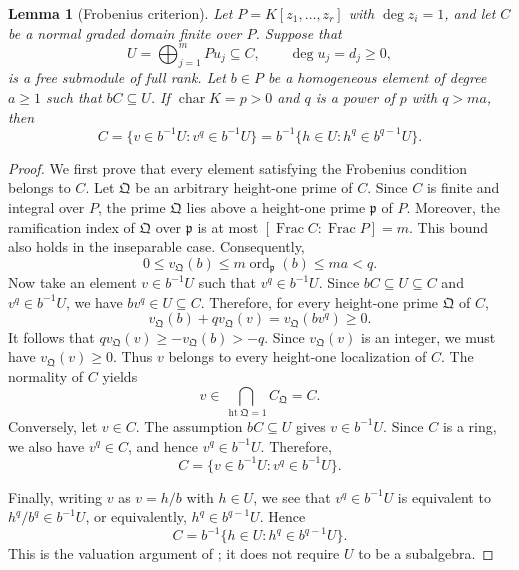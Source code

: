 \documentclass[12pt]{amsart}
\numberwithin{equation}{section}
\newtheorem{lemma}[theorem]{Lemma}
\theoremstyle{definition}
\theoremstyle{remark}
\numberwithin{equation}{section}
\begin{document}
\begin{lemma}[Frobenius criterion]
\label{lem:index-Frobenius}
Let $P=K[z_1,\ldots,z_r]$ with $\deg z_i=1$, and let $C$ be a normal graded domain finite over $P$. Suppose that
\[
U=\bigoplus_{j=1}^mPu_j\subseteq C,\qquad \deg u_j=d_j\ge0,
\]
is a free submodule of full rank. Let $b\in P$ be a homogeneous element of degree $a\ge1$ such that $bC\subseteq U$. If $\operatorname{char}K=p>0$ and $q$ is a power of $p$ with $q>ma$, then
\[
C=\{v\in b^{-1}U:v^q\in b^{-1}U\}=b^{-1}\{h\in U:h^q\in b^{q-1}U\}.
\]
\end{lemma}
\begin{proof}
We first prove that every element satisfying the Frobenius condition belongs to $C$. Let $\mathfrak Q$ be an arbitrary height-one prime of $C$.
Since $C$ is finite and integral over $P$, the prime $\mathfrak Q$ lies above a height-one prime $\mathfrak p$ of $P$.
Moreover, the ramification index of $\mathfrak Q$ over $\mathfrak p$ is at most $[\operatorname{Frac}C:\operatorname{Frac}P]=m$.
This bound also holds in the inseparable case. Consequently,
\[
 0\le v_{\mathfrak Q}(b)
 \le m\operatorname{ord}_{\mathfrak p}(b)
 \le ma<q.
\]
Now take an element $v\in b^{-1}U$ such that $v^q\in b^{-1}U$. Since $bC\subseteq U\subseteq C$ and $v^q\in b^{-1}U$, we have $bv^q\in U\subseteq C$.
Therefore, for every height-one prime $\mathfrak Q$ of $C$,
\[
 v_{\mathfrak Q}(b)+qv_{\mathfrak Q}(v)
 =v_{\mathfrak Q}(bv^q)\ge0.
\]
It follows that $qv_{\mathfrak Q}(v) \ge -v_{\mathfrak Q}(b)>-q$.
Since $v_{\mathfrak Q}(v)$ is an integer, we must have $v_{\mathfrak Q}(v)\ge0$.
Thus $v$ belongs to every height-one localization of $C$. The normality of $C$ yields
\[
 v\in\bigcap_{\operatorname{ht}\mathfrak Q=1}C_{\mathfrak Q} =C.
\]
Conversely, let $v\in C$. The assumption $bC\subseteq U$ gives $v\in b^{-1}U$. Since $C$ is a ring, we also have $v^q\in C$, and hence
$v^q\in b^{-1}U$. Therefore,
\[
C=\{v\in b^{-1}U:v^q\in b^{-1}U\}.
\]

Finally, writing $v$ as  $v=h/b$ with $h\in U$, we see that $v^q\in b^{-1}U$ is equivalent to $h^q/b^q\in b^{-1}U$, or equivalently, $h^q\in b^{q-1}U$. Hence
\[
 C=b^{-1}\{h\in U:h^q\in b^{q-1}U\}.
\]
This is the valuation argument of \cite[Theorem~1.1]{SS}; it does not require $U$ to be a subalgebra.
\end{proof}
\end{document}
